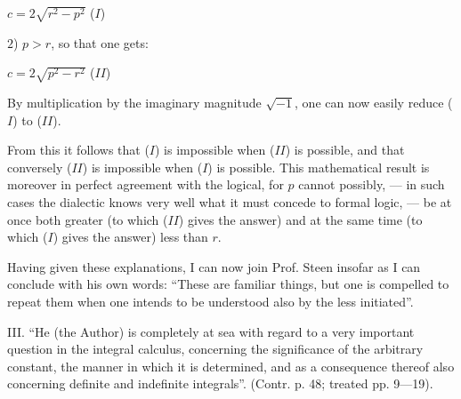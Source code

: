 \documentclass[12pt,a4paper,openany]{book}
\newcommand{\opage}[1]{\marginnote{\footnotesize\textit{[#1]}}}
\begin{document}
\begin{center}$c = 2\sqrt{r^{2} - p^{2}}$ ($I$)\end{center}

$2$) $p > r$, so that one gets:

\begin{center}$c = 2\sqrt{p^{2} - r^{2}}$ ($II$)\end{center}

By multiplication by the imaginary magnitude $\sqrt{-1}$,
one can now easily reduce ($I$) to ($II$).

From this it follows that ($I$) is impossible when ($II$) is possible,
and that conversely ($II$) is impossible when ($I$) is possible. This
mathematical result is moreover in perfect agreement
with the logical, for $p$ cannot possibly, --- in such cases
the dialectic knows very well what it must concede to formal logic, --- be at once both greater (to which
($II$) gives the answer) and at the same time (to which ($I$) gives the answer) less than $r$.

Having given these explanations, I can now join Prof. Steen
insofar as I can conclude with his own words: ``These are familiar things, but one
is compelled to repeat them when one intends to be understood
also by the less initiated''.

III. ``He (the Author) is completely at sea with
regard to a very important question in the integral calculus,
concerning the significance of the arbitrary constant, the manner
\opage{28}\setcounter{footnote}{0}%
in which it is determined, and as a consequence thereof also concerning
definite and indefinite integrals''. (Contr. p. 48; treated
pp. 9---19).
\end{document}
